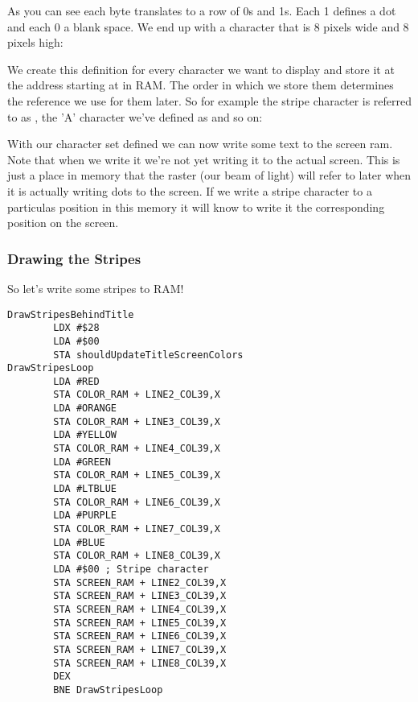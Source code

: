 As you can see each byte translates to a row of 0s and 1s. Each 1 defines a dot and each 0 a blank space. We end up
with a character that is 8 pixels wide and 8 pixels high:



We create this definition for every character we want to display and store it at the address starting at 
in RAM. The order in which we store them determines the reference we use for them later. So for example the stripe
character is referred to as , the 'A' character we've defined as  and so on:



With our character set defined we can now write some text to the screen ram. Note that when we write it 
we're not yet writing it to the actual screen. This is just a place in memory that the raster (our beam of light)
will refer to later when it is actually writing dots to the screen. If we write a stripe character to a particulas position
in this  memory it will know to write it the corresponding position on the screen.

\subsubsection{Drawing the Stripes}
So let's write some stripes to RAM!

\begin{lstlisting}[caption=The 'stripe' character.]
DrawStripesBehindTitle
        LDX #$28
        LDA #$00
        STA shouldUpdateTitleScreenColors
DrawStripesLoop   
        LDA #RED
        STA COLOR_RAM + LINE2_COL39,X
        LDA #ORANGE
        STA COLOR_RAM + LINE3_COL39,X
        LDA #YELLOW
        STA COLOR_RAM + LINE4_COL39,X
        LDA #GREEN
        STA COLOR_RAM + LINE5_COL39,X
        LDA #LTBLUE
        STA COLOR_RAM + LINE6_COL39,X
        LDA #PURPLE
        STA COLOR_RAM + LINE7_COL39,X
        LDA #BLUE
        STA COLOR_RAM + LINE8_COL39,X
        LDA #$00 ; Stripe character
        STA SCREEN_RAM + LINE2_COL39,X
        STA SCREEN_RAM + LINE3_COL39,X
        STA SCREEN_RAM + LINE4_COL39,X
        STA SCREEN_RAM + LINE5_COL39,X
        STA SCREEN_RAM + LINE6_COL39,X
        STA SCREEN_RAM + LINE7_COL39,X
        STA SCREEN_RAM + LINE8_COL39,X
        DEX
        BNE DrawStripesLoop

\end{lstlisting}

